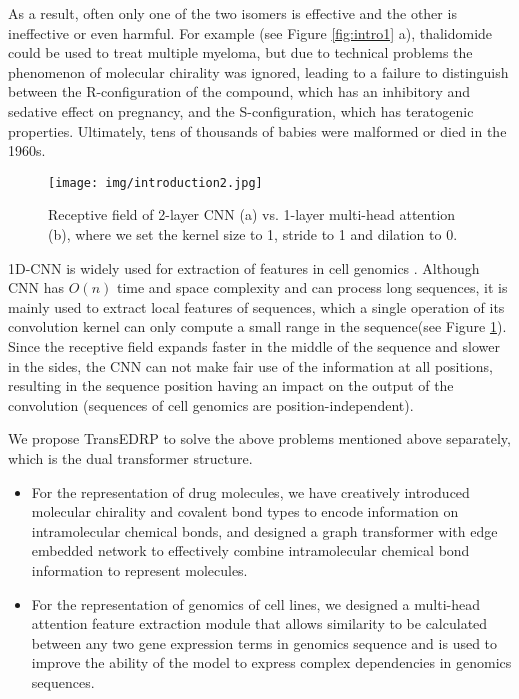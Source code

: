 \documentclass{article}
\begin{document}
As a result, often only one of the two isomers is effective and the other is ineffective or even harmful. For example (see Figure \ref{fig:intro1} a), thalidomide could be used to treat multiple myeloma, but due to technical problems the phenomenon of molecular chirality was ignored, leading to a failure to distinguish between the R-configuration of the compound, which has an inhibitory and sedative effect on pregnancy, and the S-configuration, which has teratogenic properties. Ultimately, tens of thousands of babies were malformed or died in the 1960s.



\begin{figure}[htbp]
    \centering
	\texttt{[image: img/introduction2.jpg]}
	\caption{Receptive field of 2-layer CNN (a) vs. 1-layer multi-head attention (b), where we set the kernel size to 1, stride to 1 and dilation to 0.}
	\label{fig:intro2}
\end{figure}







1D-CNN is widely used for extraction of features in cell genomics  \cite{tcnns,110bGCNforDRP,DeepCDR,GraTransDRP,GraphDTA}.
Although CNN has $O(n)$ time and space complexity and can process long sequences, it is mainly used to extract local features of sequences, which a single operation of its convolution kernel can only compute a small range in the sequence(see Figure \ref{fig:intro2}). 
Since the receptive field expands faster in the middle of the sequence and slower in the sides, the CNN can not make fair use of the information at all positions, resulting in the sequence position having an impact on the output of the convolution (sequences  of cell genomics  are position-independent).








 We propose TransEDRP  to solve the above problems mentioned above separately, which is the dual transformer structure.



\begin{itemize}
  \item [1)] 
For the representation of drug molecules, we have creatively introduced molecular chirality and covalent bond types to encode information on intramolecular chemical bonds, and designed a graph transformer with edge embedded network to effectively combine intramolecular chemical bond information to represent molecules.
  \item [2)] 
For the representation of genomics of cell lines, we designed a multi-head attention feature extraction module  that allows similarity to be calculated between any two gene expression terms in genomics sequence and is used to improve the ability of the model to express complex dependencies in genomics sequences.
\end{itemize}
\end{document}
